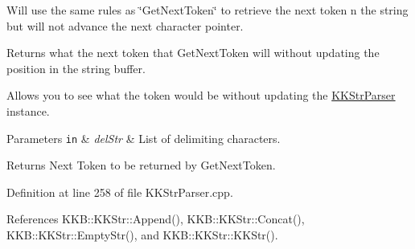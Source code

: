 Will use the same rules as \char`\"{}\+Get\+Next\+Token\char`\"{} to retrieve the next token n the string but will not advance the next character pointer. 

Returns what the next token that \textquotesingle{}Get\+Next\+Token\textquotesingle{} will without updating the position in the string buffer.

Allows you to see what the token would be without updating the \hyperlink{class_k_k_b_1_1_k_k_str_parser}{K\+K\+Str\+Parser} instance. 
\begin{DoxyParams}[1]{Parameters}
\mbox{\tt in}  & {\em del\+Str} & List of delimiting characters. \\
\hline
\end{DoxyParams}
\begin{DoxyReturn}{Returns}
Next Token to be returned by \textquotesingle{}Get\+Next\+Token\textquotesingle{}. 
\end{DoxyReturn}


Definition at line 258 of file K\+K\+Str\+Parser.\+cpp.



References K\+K\+B\+::\+K\+K\+Str\+::\+Append(), K\+K\+B\+::\+K\+K\+Str\+::\+Concat(), K\+K\+B\+::\+K\+K\+Str\+::\+Empty\+Str(), and K\+K\+B\+::\+K\+K\+Str\+::\+K\+K\+Str().


